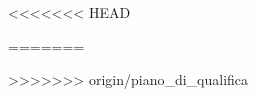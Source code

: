 <<<<<<< HEAD
\newcommand{\sethdr}[1]{
		\pagestyle{fancy}
		\lhead{\texttt{[image: Swellfish\_logo.png]}}	
		\rhead{#1}
}



=======
\newcommand{\sethdr}[1]{
		\pagestyle{fancy}
		\lhead{\texttt{[image: Swellfish\_logo.png]}}	
		\rhead{#1}
}




>>>>>>> origin/piano_di_qualifica
